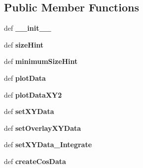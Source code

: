 \subsection*{Public Member Functions}
\begin{DoxyCompactItemize}
\item 
\hypertarget{classMyPlotWidget_1_1MyPlotWidget_a6609ab444ac92ada3d856756c4d63ff3}{def {\bfseries \-\_\-\-\_\-init\-\_\-\-\_\-}}\label{classMyPlotWidget_1_1MyPlotWidget_a6609ab444ac92ada3d856756c4d63ff3}

\item 
\hypertarget{classMyPlotWidget_1_1MyPlotWidget_a7cc35e9fdcea629d444e69c9be1f17e5}{def {\bfseries size\-Hint}}\label{classMyPlotWidget_1_1MyPlotWidget_a7cc35e9fdcea629d444e69c9be1f17e5}

\item 
\hypertarget{classMyPlotWidget_1_1MyPlotWidget_a24bbe5fb4b29afdb328e65616fd49607}{def {\bfseries minimum\-Size\-Hint}}\label{classMyPlotWidget_1_1MyPlotWidget_a24bbe5fb4b29afdb328e65616fd49607}

\item 
\hypertarget{classMyPlotWidget_1_1MyPlotWidget_a51f5c70ea2dd4024e4c56a0a73925164}{def {\bfseries plot\-Data}}\label{classMyPlotWidget_1_1MyPlotWidget_a51f5c70ea2dd4024e4c56a0a73925164}

\item 
\hypertarget{classMyPlotWidget_1_1MyPlotWidget_aa715ad5a13d60bef1d1d8f35d17a128d}{def {\bfseries plot\-Data\-X\-Y2}}\label{classMyPlotWidget_1_1MyPlotWidget_aa715ad5a13d60bef1d1d8f35d17a128d}

\item 
\hypertarget{classMyPlotWidget_1_1MyPlotWidget_adf3455693401acc7a41cc2b167c8ea7d}{def {\bfseries set\-X\-Y\-Data}}\label{classMyPlotWidget_1_1MyPlotWidget_adf3455693401acc7a41cc2b167c8ea7d}

\item 
\hypertarget{classMyPlotWidget_1_1MyPlotWidget_a6298a336d89650749a4c04e28bcf4274}{def {\bfseries set\-Overlay\-X\-Y\-Data}}\label{classMyPlotWidget_1_1MyPlotWidget_a6298a336d89650749a4c04e28bcf4274}

\item 
\hypertarget{classMyPlotWidget_1_1MyPlotWidget_ac55f01d08b5bf74fe1bfeb2719747a92}{def {\bfseries set\-X\-Y\-Data\-\_\-\-Integrate}}\label{classMyPlotWidget_1_1MyPlotWidget_ac55f01d08b5bf74fe1bfeb2719747a92}

\item 
\hypertarget{classMyPlotWidget_1_1MyPlotWidget_a2ba64fd7e8dd68a755267f4fbcde2b45}{def {\bfseries create\-Cos\-Data}}\label{classMyPlotWidget_1_1MyPlotWidget_a2ba64fd7e8dd68a755267f4fbcde2b45}


\end{DoxyCompactItemize}
